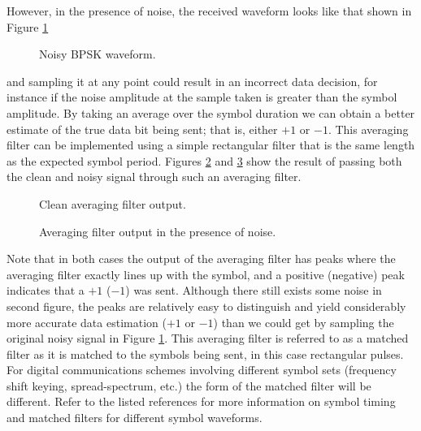 However, in the presence of noise, the received waveform looks like
that shown in Figure \ref{fig: noisy_BPSK}
\begin{figure}[ht]
   \begin{center}
      \caption{Noisy BPSK waveform.}
      \label{fig: noisy_BPSK}
   \end{center}
\end{figure}
and sampling it at any point could result in an incorrect data decision,
for instance if the noise amplitude at the sample taken is greater than
the symbol amplitude.
By taking 
an average over the symbol duration we can obtain a better estimate
of the true data bit being sent; that is, either $+1$ or $-1$.  
This averaging filter can be implemented
using a simple rectangular filter that is the same length as the 
expected symbol period.  
Figures \ref{fig: clean_mf_out} and \ref{fig: noisy_mf_out}
show the result of passing both the clean 
and noisy signal through such an averaging filter.

\begin{figure}[ht]
   \begin{center}
      \caption{Clean averaging filter output.}
      \label{fig: clean_mf_out}
   \end{center}
\end{figure}
\begin{figure}[ht]
   \begin{center}
      \caption{Averaging filter output in the presence of noise.}
      \label{fig: noisy_mf_out}
   \end{center}
\end{figure}

Note that in both cases the output of the averaging filter has peaks
where the averaging filter exactly lines up with the symbol, and a positive
(negative) peak indicates that a $+1$ ($-1$) was sent.  Although there still
exists some noise in second figure, the peaks 
are relatively easy to distinguish and yield considerably more
accurate data estimation ($+1$ or $-1$) than we could get
by sampling the original noisy signal in Figure \ref{fig: noisy_BPSK}.
This averaging filter is referred to as a matched filter as it
is matched to the symbols being sent, in this case rectangular
pulses.  For digital communications schemes involving different
symbol sets (frequency shift keying, spread-spectrum, etc.) 
the form of the matched filter will be different.  
Refer to the listed references for more information on symbol timing and 
matched filters for different symbol waveforms.


